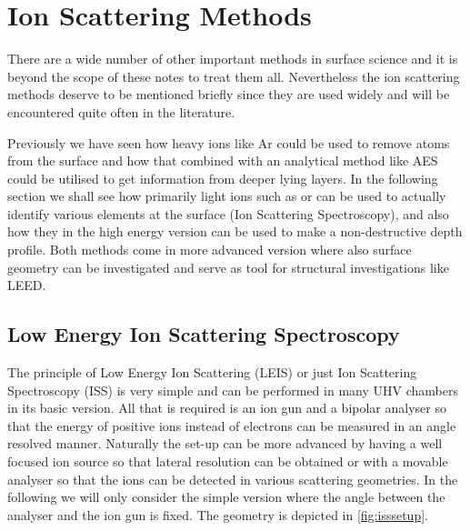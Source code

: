 \chapter{Ion Scattering Methods}
There are a wide number of other important methods in surface science and it is beyond the scope of these notes to treat them all. Nevertheless the ion scattering methods deserve to be mentioned briefly since they are used widely and will be encountered quite often in the literature.

Previously we have seen how heavy ions like Ar could be used to remove atoms from the surface and how that combined with an analytical method like AES could be utilised to get information from deeper lying layers. In the following section we shall see how primarily light ions such as  or  can be used to actually identify various elements at the surface (Ion Scattering Spectroscopy), and also how they in the high energy version can be used to make a non-destructive depth profile. Both methods come in more advanced version where also surface geometry can be investigated and serve as tool for structural investigations like LEED.

\section{Low Energy Ion Scattering Spectroscopy}
The principle of Low Energy Ion Scattering (LEIS) or just Ion Scattering Spectroscopy (ISS) is very simple and can be performed in many UHV chambers in its basic version. All that is required is an ion gun and a bipolar analyser so that the energy of positive ions instead of electrons can be measured in an angle resolved manner. Naturally the set-up can be more advanced by having a well focused ion source so that lateral resolution can be obtained or with a movable analyser so that the ions can be detected in various scattering geometries. In the following we will only consider the simple version where the angle between the analyser and the ion gun is fixed. The geometry is depicted in \autoref{fig:isssetup}.

